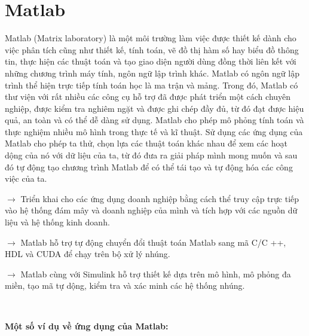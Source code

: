 \documentclass[12pt,a4paper]{report}
\begin{document}
    \section{Matlab}
    
    Matlab (Matrix laboratory) là một môi trường làm việc được thiết kế dành cho việc phân tích cũng như thiết kế, tính toán, vẽ đồ thị hàm số hay biểu đồ thông tin, thực hiện các thuật toán và tạo giao diện người dùng đồng thời liên kết với những chương trình máy tính, ngôn ngữ lập trình khác. Matlab có ngôn ngữ lập trình thể hiện trực tiếp tính toán học là ma trận và mảng.
    Trong đó, Matlab có thư viện với rất nhiều các công cụ hỗ trợ đã được phát triển một cách chuyên nghiệp, được kiểm tra nghiêm ngặt và được ghi chép đầy đủ, từ đó đạt được hiệu quả, an toàn và có thể dễ dàng sử dụng. Matlab cho phép mô phỏng tính toán và thực nghiệm nhiều mô hình trong thực tế và kĩ thuật. Sử dụng các ứng dụng của Matlab cho phép ta thử, chọn lựa các thuật toán khác nhau để xem các hoạt dộng của nó với dữ liệu của ta, từ đó đưa ra giải pháp mình mong muốn và sau đó tự động tạo chương trình Matlab để có thể tái tạo và tự động hóa các công việc của ta.
    
    $\longrightarrow$ Triển khai cho các ứng dụng doanh nghiệp bằng cách thể truy cập trực tiếp vào hệ thống đám mây và doanh nghiệp của mình và tích hợp với các nguồn dữ liệu và hệ thống kinh doanh.
    
    $\longrightarrow$ Matlab hỗ trợ tự động chuyển đổi thuật toán Matlab sang mã C/C ++, HDL và CUDA để chạy trên bộ xử lý nhúng.
    
    $\longrightarrow$ Matlab cùng với Simulink hỗ trợ thiết kế dựa trên mô hình, mô phỏng đa miền, tạo mã tự dộng, kiểm tra và xác minh các hệ thống nhúng.
    
    \
    
    \begin{center}
    \textbf{Một số ví dụ về ứng dụng của Matlab:}
    \end{center}
\end{document}
